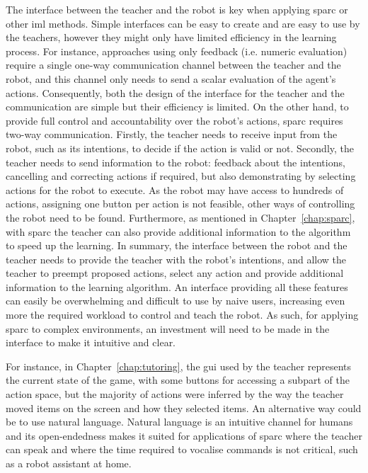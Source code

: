 The interface between the teacher and the robot is key when applying \gls{sparc} or other \gls{iml} methods. Simple interfaces can be easy to create and are easy to use by the teachers, however they might only have limited efficiency in the learning process. For instance, approaches using only feedback (i.e. numeric evaluation) require a single one-way communication channel between the teacher and the robot, and this channel only needs to send a scalar evaluation of the agent's actions. Consequently, both the design of the interface for the teacher and the communication are simple but their efficiency is limited. On the other hand, to provide full control and accountability over the robot's actions, \gls{sparc} requires two-way communication. Firstly, the teacher needs to receive input from the robot, such as its intentions, to decide if the action is valid or not. Secondly, the teacher needs to send information to the robot: feedback about the intentions, cancelling and correcting actions if required, but also demonstrating by selecting actions for the robot to execute. As the robot may have access to hundreds of actions, assigning one button per action is not feasible, other ways of controlling the robot need to be found. Furthermore, as mentioned in Chapter~\ref{chap:sparc}, with \gls{sparc} the teacher can also provide additional information to the algorithm to speed up the learning. In summary, the interface between the robot and the teacher needs to provide the teacher with the robot's intentions, and allow the teacher to preempt proposed actions, select any action and provide additional information to the learning algorithm. An interface providing all these features can easily be overwhelming and difficult to use by naive users, increasing even more the required workload to control and teach the robot. As such, for applying \gls{sparc} to complex environments, an investment will need to be made in the interface to make it intuitive and clear. 

For instance, in Chapter~\ref{chap:tutoring}, the \gls{gui} used by the teacher represents the current state of the game, with some buttons for accessing a subpart of the action space, but the majority of actions were inferred by the way the teacher moved items on the screen and how they selected items. An alternative way could be to use natural language. Natural language is an intuitive channel for humans and its open-endedness makes it suited for applications of \gls{sparc} where the teacher can speak and where the time required to vocalise commands is not critical, such as a robot assistant at home.

